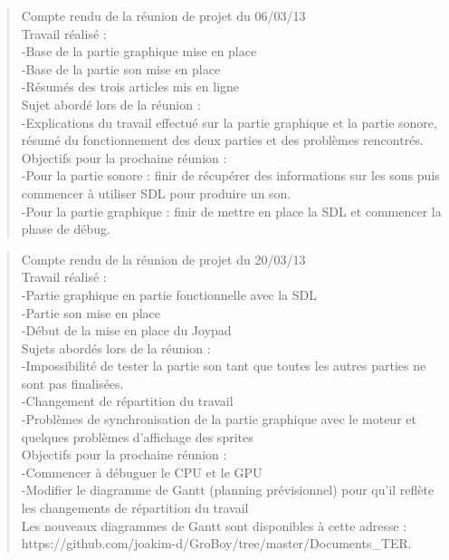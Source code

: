 \documentclass{report}
\begin{document}
\begin{quotation}
Compte rendu de la réunion de projet du 06/03/13\\
Travail réalisé :\\
	-Base de la partie graphique mise en place\\
	-Base de la partie son mise en place\\
	-Résumés des trois articles mis en ligne\\
Sujet abordé lors de la réunion :\\
	-Explications du travail effectué sur la partie graphique et la partie sonore, résumé du fonctionnement des deux parties et des problèmes rencontrés.\\
Objectifs pour la prochaine réunion :\\
	-Pour la partie sonore : finir de récupérer des informations sur les sons puis commencer à utiliser SDL pour produire un son.\\
	-Pour la partie graphique : finir de mettre en place la SDL et commencer la phase de débug.\\
\end{quotation}

\begin{quotation}
Compte rendu de la réunion de projet du 20/03/13\\
Travail réalisé :\\
	-Partie graphique en partie fonctionnelle avec la SDL\\
	-Partie son mise en place\\
	-Début de la mise en place du Joypad\\
Sujets abordés lors de la réunion :\\
	-Impossibilité de tester la partie son tant que toutes les autres parties ne sont pas finalisées.\\
	-Changement de répartition du travail\\
	-Problèmes de synchronisation de la partie graphique avec le moteur et quelques problèmes d’affichage des sprites\\
Objectifs pour la prochaine réunion :\\
	-Commencer à débuguer le CPU et le GPU\\
	-Modifier le diagramme de Gantt (planning prévisionnel) pour qu’il reflète les changements de répartition du travail\\
Les nouveaux diagrammes de Gantt sont disponibles à cette adresse : https://github.com/joakim-d/GroBoy/tree/master/Documents\_TER.\\
\end{quotation}
\end{document}
